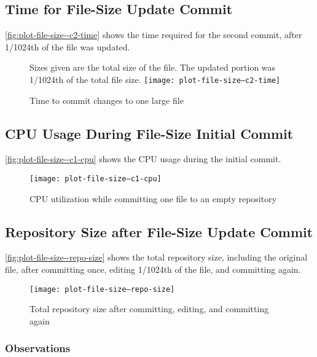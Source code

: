 \subsection{Time for File-Size Update Commit}

\autoref{fig:plot-file-size--c2-time} shows the time required for the second
commit, after \num{1/1024}th of the file was updated.


\begin{figure}[]
    \caption{Time to commit changes to one large file}
    \label{fig:plot-file-size--c2-time}
    \centering
    Sizes given are the total size of the file. The updated portion was
    \num{1/1024}th of the total file size.
    \texttt{[image: plot-file-size--c2-time]}
\end{figure}


\subsection{CPU Usage During File-Size Initial Commit}

\autoref{fig:plot-file-size--c1-cpu} shows the
CPU usage during the initial commit.

\begin{figure}[]
  \caption{CPU utilization while committing one file to an empty repository}
  \label{fig:plot-file-size--c1-cpu}
  \centering
    \texttt{[image: plot-file-size--c1-cpu]}
\end{figure}


\subsection{Repository Size after File-Size Update Commit}

\autoref{fig:plot-file-size--repo-size} shows the total
repository size, including the original file, after committing once, editing
1/1024th of the file, and committing again.


\begin{figure}[]
  \caption{Total repository size after committing, editing, and committing again}
  \label{fig:plot-file-size--repo-size}
  \centering
    \texttt{[image: plot-file-size--repo-size]}
\end{figure}

\iffalse

\subsubsection{Observations}

